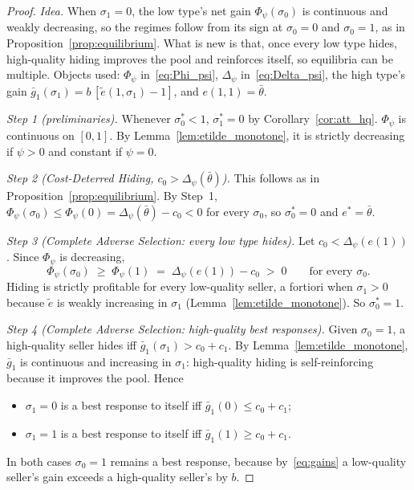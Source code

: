 \begin{proof}\upshape
\emph{Idea.} When $\sigma_1=0$, the low type's net gain $\Phi_\psi(\sigma_0)$ is continuous and weakly decreasing, so the regimes follow from its sign at $\sigma_0=0$ and $\sigma_0=1$, as in Proposition~\ref{prop:equilibrium}. What is new is that, once every low type hides, high-quality hiding improves the pool and reinforces itself, so equilibria can be multiple. Objects used: $\Phi_\psi$ in~\eqref{eq:Phi_psi}, $\Delta_\psi$ in~\eqref{eq:Delta_psi}, the high type's gain $\bar g_1(\sigma_1)=b\,[\tilde e(1,\sigma_1)-1]$, and $e(1,1)=\bar\theta$.

\emph{Step 1 (preliminaries).} Whenever $\sigma_0^*<1$, $\sigma_1^*=0$ by Corollary~\ref{cor:att_hq}. $\Phi_\psi$ is continuous on $[0,1]$. By Lemma~\ref{lem:etilde_monotone}, it is strictly decreasing if $\psi>0$ and constant if $\psi=0$.

\emph{Step 2 (Cost-Deterred Hiding, $c_0>\Delta_\psi(\bar\theta)$).} This follows as in Proposition~\ref{prop:equilibrium}. By Step~1, $\Phi_\psi(\sigma_0)\le\Phi_\psi(0)=\Delta_\psi(\bar\theta)-c_0<0$ for every $\sigma_0$, so $\sigma_0^*=0$ and $e^*=\bar\theta$.

\emph{Step 3 (Complete Adverse Selection: every low type hides).} Let $c_0<\Delta_\psi(e(1))$. Since $\Phi_\psi$ is decreasing,
\begin{equation*}
    \Phi_\psi(\sigma_0)\;\ge\;\Phi_\psi(1)\;=\;\Delta_\psi(e(1))-c_0\;>\;0\qquad\text{for every }\sigma_0 .
\end{equation*}
Hiding is strictly profitable for every low-quality seller, a fortiori when $\sigma_1>0$ because $\tilde e$ is weakly increasing in $\sigma_1$ (Lemma~\ref{lem:etilde_monotone}). So $\sigma_0^*=1$.

\emph{Step 4 (Complete Adverse Selection: high-quality best responses).} Given $\sigma_0=1$, a high-quality seller hides iff $\bar g_1(\sigma_1)>c_0+c_1$. By Lemma~\ref{lem:etilde_monotone}, $\bar g_1$ is continuous and increasing in $\sigma_1$: high-quality hiding is self-reinforcing because it improves the pool. Hence
\begin{itemize}
    \item $\sigma_1=0$ is a best response to itself iff $\bar g_1(0)\le c_0+c_1$;
    \item $\sigma_1=1$ is a best response to itself iff $\bar g_1(1)\ge c_0+c_1$.
\end{itemize}
In both cases $\sigma_0=1$ remains a best response, because by~\eqref{eq:gains} a low-quality seller's gain exceeds a high-quality seller's by $b$.


\end{proof}
